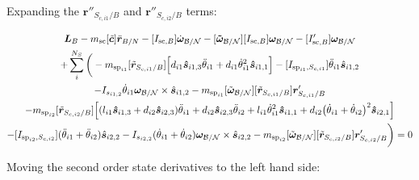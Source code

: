 \documentclass[paper]{aiaaNew}
\begin{document}
Expanding the $\bm{r}''_{S_{c,i1}/B}$ and $\bm{r}''_{S_{c,i2}/B}$ terms:

\begin{multline}
\bm L_B - m_{\text{sc}} [\tilde{\bm c}] \ddot{\bm r}_{B/N} -[I_{\text{sc},B}] \dot{\bm\omega}_{\cal B/N} -[\bm{\tilde{\omega}}_{\cal B/N}] [I_{\text{sc},B}] \bm\omega_{\cal B/N} - [I'_{\text{sc},B}] \bm\omega_{\cal B/N}
\\
+ \sum\limits_{i}^{N_S}\bigg(
- m_{\text{sp}_{i1}} [\tilde{{\bm r}}_{S_{c,i1}/B}] \Big[d_{i1} \bm{\hat{s}}_{i1,3} \ddot{\theta}_{i1} + d_{i1} \dot{\theta}_{i1}^2 \bm{\hat{s}}_{i1,1} \Big]
-[I_{\text{sp}_{i1},S_{c,i1}}] \ddot{\theta}_{i1} \hat{\bm s}_{i1,2} 
\\-I_{s_{i1,2}} \dot{\theta}_{i1} \bm \omega_{\cal{B/N}} \times \hat{\bm s}_{i1,2} - m_{\text{sp}_{i1}} [\tilde{\bm\omega}_{\cal B/N}] [\tilde{{\bm r}}_{S_{c,i1}/B}] \bm{r}'_{S_{c,i1}/B}
\\
- m_{\text{sp}_{i2}} [\tilde{{\bm r}}_{S_{c,i2}/B}] \Big[(l_{i1} \bm{\hat{s}}_{i1,3} + d_{i2} \bm{\hat{s}}_{i2,3}) \ddot{\theta}_{i1} + d_{i2} \bm{\hat{s}}_{i2,3} \ddot{\theta}_{i2} + l_{i1} \dot{\theta}_{i1}^2 \bm{\hat{s}}_{i1,1} + d_{i2}\big(\dot{\theta}_{i1} + \dot{\theta}_{i2}\big)^2\bm{\hat{s}}_{i2,1}\Big]\\
-[I_{\text{sp}_{i2},S_{c,i2}}] (\ddot{\theta}_{i1}  + \ddot{\theta}_{i2})\hat{\bm s}_{i2,2} 
-I_{s_{i2,2}}  (\dot{\theta}_{i1}  + \dot{\theta}_{i2}) \bm \omega_{\cal{B/N}} \times \hat{\bm s}_{i2,2} - m_{\text{sp}_{i2}} [\tilde{\bm\omega}_{\cal B/N}] [\tilde{{\bm r}}_{S_{c,i2}/B}] \bm{r}'_{S_{c,i2}/B} \bigg) = 0
\end{multline}

Moving the second order state derivatives to the left hand side:
\end{document}
